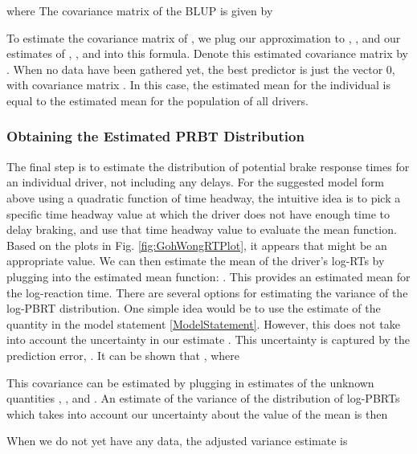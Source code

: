 \documentclass[conference]{IEEEtran}
\begin{document}
 where
 The covariance matrix of the BLUP  is given by


To estimate the covariance matrix of , we plug our approximation to , , and our estimates of , , and  into this formula.  Denote this estimated covariance matrix by .
When no data have been gathered yet, the best predictor is just the vector 0, with covariance matrix . In this case, the estimated mean for the individual is equal to the estimated mean for the population of all drivers.
\subsubsection{Obtaining the Estimated PRBT Distribution}
The final step is to estimate the distribution of potential brake response times for an individual driver, not including any delays.  For the suggested model form above using a quadratic function of time headway, the intuitive idea is to pick a specific time headway value  at which the driver does not have enough time to delay braking, and use that time headway value to evaluate the mean function.  Based on the plots in Fig. \ref{fig:GohWongRTPlot}, it appears that  might be an appropriate value.  We can then estimate the mean of the driver's log-RTs by plugging  into the estimated mean function:
.  This provides an estimated mean for the log-reaction time.
There are several options for estimating the variance of the log-PBRT distribution. One simple idea would be to use the estimate  of the quantity  in the model statement \ref{ModelStatement}.  However, this does not take into account the uncertainty in our estimate .  This uncertainty is captured by the prediction error, .  It can be shown that , where


This covariance can be estimated by plugging in estimates of the unknown quantities , , and .  An estimate of the variance of the distribution of log-PBRTs which takes into account our uncertainty about the value of the mean is then

When we do not yet have any data, the adjusted variance estimate is
\end{document}
